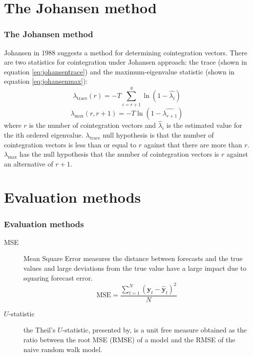 \documentclass{beamer}
\begin{document}
\section{The Johansen method}

\begin{frame}
\frametitle{The Johansen method}
Johansen in 1988 suggests a method for determining
cointegration vectors. 
There are two statistics for cointegration under Johansen approach: the trace
(shown in equation \ref{eq:johansentrace}) and the maximum-eigenvalue statistic
(shown in equation \ref{eq:johansenmax}):
\begin{equation}
\label{eq:johansentrace}
\lambda_{\text{trace}} (r) = -T \sum_{i=r+1}^g \ln(1-\hat{\lambda_i})
\end{equation}
\begin{equation}
\label{eq:johansenmax}
\lambda_{\text{max}} (r,r+1) = -T \ln(1-\hat{\lambda_{r+1}})
\end{equation}
\noindent where $r$ is the number of cointegration vectors and
$\hat{\lambda}_i$ is the estimated value for the ith ordered eigenvalue.
$\lambda_{\text{trace}}$ null hypothesis is that the number of cointegration
vectors is less than or equal to $r$ against that there are more than $r$.
$\lambda_{\text{max}}$ has the null hypothesis that the number of cointegration
vectors is $r$ against an alternative of $r +1$.
\end{frame}

\section{Evaluation methods}
\begin{frame}
\frametitle{Evaluation methods}
\begin{description}
\item[MSE]  Mean Square Error measures the distance between forecasts
and the true values and large deviations from the true value have a
large impact due to squaring forecast error.
\begin{equation}\label{eq:MSE}
\text{MSE} = 
\frac{\displaystyle \sum_{t=1}^{N} (\mathbf{y}_t-\hat{\mathbf{y}}_t)^2}{N}
\end{equation}
\item[$U$-statistic] the Theil's $U$-statistic, presented by, is a unit free measure obtained as the ratio between the root
MSE (RMSE) of a model and the RMSE of the naive random walk model. 
\end{description}
\end{frame}
\end{document}
